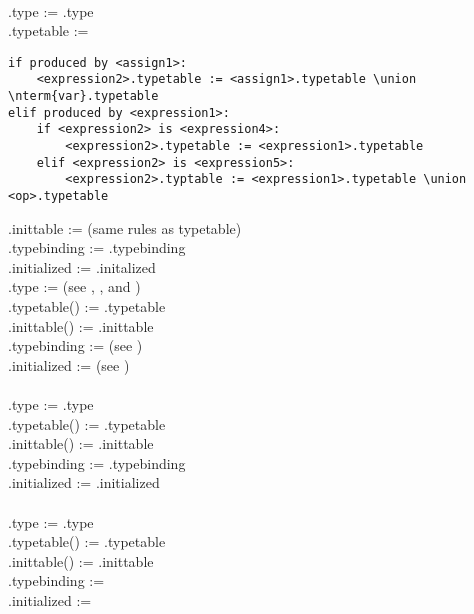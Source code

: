 \documentclass{article}
\begin{document}
\begin{enumerate}
{\it {} \rarrow {}}\\
.type := .type\\
.typetable := \begin{lstlisting}
if produced by <assign1>:
    <expression2>.typetable := <assign1>.typetable \union \nterm{var}.typetable
elif produced by <expression1>:
    if <expression2> is <expression4>:
        <expression2>.typetable := <expression1>.typetable
    elif <expression2> is <expression5>:
        <expression2>.typtable := <expression1>.typetable \union <op>.typetable
\end{lstlisting}
.inittable := (same rules as typetable)\\
.typebinding := .typebinding\\
.initialized := .initalized\\

.type := (see , , and )\\
.typetable() := .typetable\\
.inittable() := .inittable\\
.typebinding := (see )\\
.initialized := (see )\\

{\it {} \rarrow {}}\\
.type := .type\\
.typetable() := .typetable\\
.inittable() := .inittable\\
.typebinding := .typebinding\\
.initialized := .initialized\\

{\it {} \rarrow {}}\\
.type := .type\\
.typetable() := .typetable\\
.inittable() := .inittable\\
.typebinding := \na\\
.initialized := \na\\


\end{enumerate}
\end{document}

